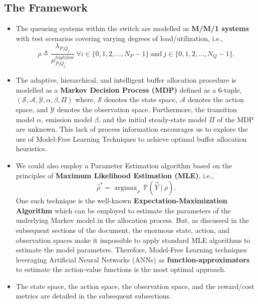 \documentclass{article}
\DeclareMathOperator*{\argmax}{argmax}
\begin{document}
\subsection{The Framework}
\begin{itemize}
    \item The queueing systems within the switch are modelled as \textbf{M/M/1 systems} with test scenarios covering varying degrees of load/utilization, i.e.,
    \begin{equation}
        \rho \triangleq \frac{\lambda_{P_i Q_j}}{\mu_{P_i Q_j}^{high|low}}\ \forall i \in \{0, 1, 2, \dots, N_P-1\}\ \text{and}\ j \in \{0, 1, 2, \dots, N_Q-1\}.
    \end{equation}
    \item The adaptive, hierarchical, and intelligent buffer allocation procedure is modelled as a \textbf{Markov Decision Process (MDP)} defined as a 6-tuple, \\$(\mathcal{S}, \mathcal{A}, \mathcal{Y}, \alpha, \beta, \Pi)$ where, $\mathcal{S}$ denotes the state space, $\mathcal{A}$ denotes the action space, and $\mathcal{Y}$ denotes the observation space. Furthermore, the transition model $\alpha$, emission model $\beta$, and the initial steady-state model $\Pi$ of the MDP are unknown. This lack of process information encourages us to explore the use of Model-Free Learning Techniques to achieve optimal buffer allocation heuristics.
    \item We could also employ a Parameter Estimation algorithm based on the principles of \textbf{Maximum Likelihood Estimation (MLE)}, i.e.,
    \[\hat{\rho}^{*} = \argmax_{\rho}\ \mathbb{P}(\vec{Y}\ |\ \rho).\]
    One such technique is the well-known \textbf{Expectation-Maximization Algorithm} which can be employed to estimate the parameters of the underlying Markov model in the allocation process. But, as discussed in the subsequent sections of the document, the enormous state, action, and observation spaces make it impossible to apply standard MLE algorithms to estimate the model parameters. Therefore, Model-Free Learning techniques leveraging Artificial Neural Networks (ANNs) as \textbf{function-approximators} to estimate the action-value functions is the most optimal approach.
    \item The state space, the action space, the observation space, and the reward/cost metrics are detailed in the subsequent subsections.
\end{itemize}
\end{document}
